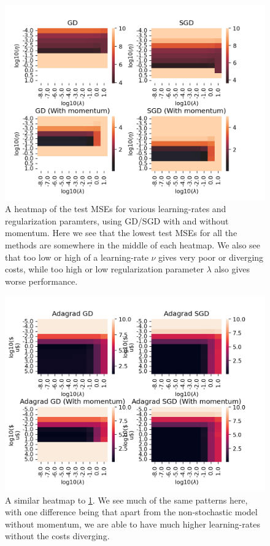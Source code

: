 \documentclass{article}
\begin{document}
\begin{figure}
      \centering
      \includegraphics[scale=0.8]{optimizers_ridge_gd_sgd}
      \caption{A heatmap of the test MSEs for various learning-rates and
            regularization paramters, using GD/SGD with and without momentum. Here we
            see that the lowest test MSEs for all the methods are somewhere in the
            middle of each heatmap. We also see that too low or high of a
            learning-rate $\nu$ gives very poor or diverging costs, while too high or
            low regularization parameter $\lambda$ also gives worse performance.}
      \label{heatmapplot-lr-lambda-gd-sgd}
\end{figure}

\begin{figure}
      \centering
      \includegraphics[scale=0.8]{optimizers_ridge_adagrad}
      \caption{A similar heatmap to \ref{heatmapplot-lr-lambda-gd-sgd}. We see
            much of the same patterns here, with one difference being that apart
            from the non-stochastic model without momentum, we are able to have
            much higher learning-rates without the costs diverging.}
      \label{heatmapplot-lr-lambda-adagrad}
\end{figure}
\end{document}
